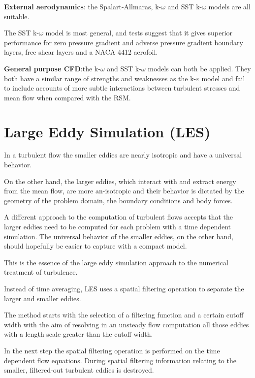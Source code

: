 \documentclass[a4paper, 15pt]{article}
\begin{document}
	\textbf{External
	aerodynamics}: the Spalart-Allmaras, k-$\omega$ and SST k-$\omega$ models are all suitable.
	
	The SST
	k-$\omega$ model is most general, and tests suggest that it gives superior performance for zero pressure
	gradient and adverse pressure gradient boundary layers, free shear layers and a NACA 4412
	aerofoil. \newline 
	
	\textbf{General
	purpose CFD}:the k-$\omega$ and SST k-$\omega$
	models can both be applied. They both have a similar range of strengths and weaknesses as the
	k-$\varepsilon$ model and fail to include accounts of more subtle interactions between turbulent stresses
	and mean flow when compared with the RSM. 

\section{Large
	Eddy Simulation (LES)}

In
a turbulent flow the smaller eddies are nearly isotropic and have a universal behavior. \newline

On
the other hand, the larger eddies, which interact with and extract energy from the mean flow,
are more an-isotropic and their behavior is dictated by the geometry of the problem domain,
the boundary conditions and body forces. \newline

A
different approach to the computation of turbulent flows accepts that the larger eddies need
to be computed for each problem with a time dependent simulation. The universal behavior of
the smaller eddies, on the other hand, should hopefully be easier to capture with a compact
model. \newline

This
is the essence of the large eddy simulation approach to the numerical treatment of
turbulence. \newline 

Instead
of time averaging, LES uses a spatial filtering operation to separate the larger and smaller
eddies. 

The
method starts with the selection of a filtering function and a certain cutoff width with the
aim of resolving in an unsteady flow computation all those eddies with a length scale greater
than the cutoff width. \newline 

In
the next step the spatial filtering operation is performed on the time dependent flow
equations. During spatial filtering information relating to the smaller, filtered-out turbulent
eddies is destroyed. \newline 
\end{document}
